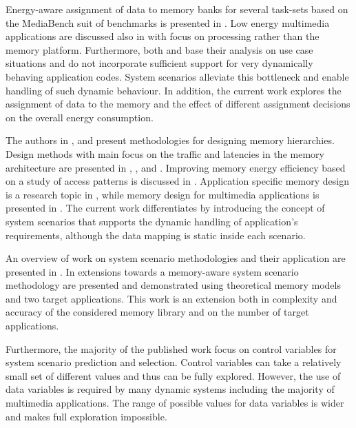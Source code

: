 \documentclass[smallcondensed]{svjour3}
\begin{document}
Energy-aware assignment of data to memory banks for several task-sets based on the MediaBench suit of benchmarks is presented in \cite{Mar03}. 
Low energy multimedia applications are discussed also in \cite{Chu02} with focus on processing rather than the memory platform. 
Furthermore, both \cite{Mar03} and \cite{Chu02} base their analysis on use case situations and do not incorporate sufficient support for very dynamically behaving application codes. 
System scenarios alleviate this bottleneck and enable handling of such dynamic behaviour. 
In addition, the current work explores the assignment of data to the memory and the effect of different assignment decisions on the overall energy consumption.

The authors in \cite{abraham1999automatic}, \cite{jacob1996analytical} and \cite{li1999hardware} present methodologies for designing memory hierarchies.
Design methods with main focus on the traffic and latencies in the memory architecture are presented in \cite{chen1999loop}, \cite{grun2000mist}, \cite{jantsch1994hardware} and \cite{passes1995multi}.
Improving memory energy efficiency based on a study of access patterns is discussed in \cite{kandemir2001improving}.
Application specific memory design is a research topic in \cite{schmit1997synthesis}, while memory design for multimedia applications is presented in \cite{oshima1997high}.
The current work differentiates by introducing the concept of system scenarios that supports the dynamic handling of application's requirements, although the data mapping is static inside each scenario. 

An overview of work on system scenario methodologies and their application are presented in \cite{Gheorghita2007}. 
In \cite{Fil12} extensions towards a memory-aware system scenario methodology are presented and demonstrated using theoretical memory models and two target applications. 
This work is an extension both in complexity and accuracy of the considered memory library and on the number of target applications. 

Furthermore, the majority of the published work focus on control variables for system scenario prediction and selection. 
Control variables can take a relatively small set of different values and thus can be fully explored. However, the use of data variables \cite{Elena2010} is required by many dynamic systems including the majority of multimedia applications. 
The range of possible values for data variables is wider and makes full exploration impossible. 
\end{document}
